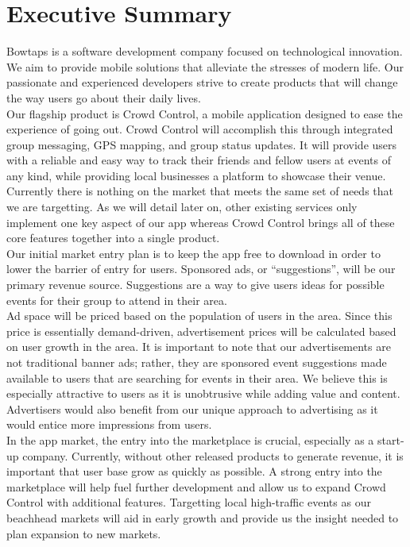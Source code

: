 
\chapter{Executive Summary}

Bowtaps is a software development company focused on technological innovation. We aim to provide mobile solutions that alleviate the stresses of modern life. Our passionate and experienced developers strive to create products that will change the way users go about their daily lives.\\

Our flagship product is Crowd Control, a mobile application designed to ease the experience of going out. Crowd Control will accomplish this through integrated group messaging, GPS mapping, and group status updates. It will provide users with a reliable and easy way to track their friends and fellow users at events of any kind, while providing local businesses a platform to showcase their venue.\\
 
Currently there is nothing on the market that meets the same set of needs that we are targetting. As we will detail later on, other existing services only implement one key aspect of our app whereas Crowd Control brings all of these core features together into a single product.\\
 
Our initial market entry plan is to keep the app free to download in order to lower the barrier of entry for users. Sponsored ads, or “suggestions”, will be our primary revenue source. Suggestions are a way to give users ideas for possible events for their group to attend in their area.\\

Ad space will be priced based on the population of users in the area. Since this price is essentially demand-driven, advertisement prices will be calculated based on user growth in the area. It is important to note that our advertisements are not traditional banner ads; rather, they are sponsored event suggestions made available to users that are searching for events in their area. We believe this is especially attractive to users as it is unobtrusive while adding value and content. Advertisers would also benefit from our unique approach to advertising as it would entice more impressions from users.\\

In the app market, the entry into the marketplace is crucial, especially as a start-up company. Currently, without other released products to generate revenue, it is important that user base grow as quickly as possible. A strong entry into the marketplace will help fuel further development and allow us to expand Crowd Control with additional features. Targetting local high-traffic events as our beachhead markets will aid in early growth and provide us the insight needed to plan expansion to new markets.\\

